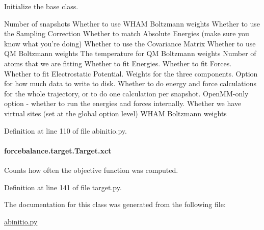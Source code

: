 Initialize the base class. 

Number of snapshots Whether to use W\-H\-A\-M Boltzmann weights Whether to use the Sampling Correction Whether to match Absolute Energies (make sure you know what you're doing) Whether to use the Covariance Matrix Whether to use Q\-M Boltzmann weights The temperature for Q\-M Boltzmann weights Number of atoms that we are fitting Whether to fit Energies. Whether to fit Forces. Whether to fit Electrostatic Potential. Weights for the three components. Option for how much data to write to disk. Whether to do energy and force calculations for the whole trajectory, or to do one calculation per snapshot. Open\-M\-M-\/only option -\/ whether to run the energies and forces internally. Whether we have virtual sites (set at the global option level) W\-H\-A\-M Boltzmann weights 

Definition at line 110 of file abinitio.\-py.

\hypertarget{classforcebalance_1_1target_1_1Target_aad2e385cfbf7b4a68f1c2cb41133fe82}{
\paragraph[{xct}]{\setlength{\rightskip}{0pt plus 5cm}forcebalance.\-target.\-Target.\-xct\hspace{0.3cm}{\ttfamily [inherited]}}}\label{classforcebalance_1_1target_1_1Target_aad2e385cfbf7b4a68f1c2cb41133fe82}


Counts how often the objective function was computed. 



Definition at line 141 of file target.\-py.



The documentation for this class was generated from the following file\-:\begin{DoxyCompactItemize}
\item 
\hyperlink{abinitio_8py}{abinitio.\-py}\end{DoxyCompactItemize}
